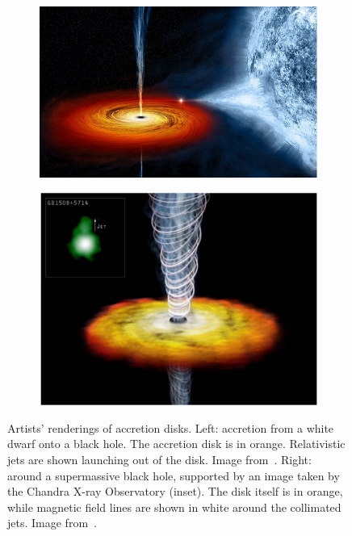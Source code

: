 \begin{figure}[h]
  \begin{subfigure}{.5\textwidth}
    \begin{center}
      \includegraphics [width=\textwidth, angle=0.]{img/binaryaccretion.jpg}
    \end{center}
  \end{subfigure}
  \begin{subfigure}{.5\textwidth}
    \begin{center}
      \includegraphics [width=\textwidth, angle=0.]{img/gb1508.pdf}
    \end{center}
  \end{subfigure}
  \caption{Artists' renderings of accretion disks. Left: accretion from a white dwarf onto a black hole. The accretion disk is in orange. Relativistic jets are shown launching out of the disk. Image from~\citet{Siemiginowska2003}. Right: around a supermassive black hole, supported by an image taken by the Chandra X-ray Observatory (inset). The disk itself is in orange, while magnetic field lines are shown in white around the collimated jets. Image from~\citet{Luminet2015}.}
  \label{fig:accdisks}
\end{figure}

